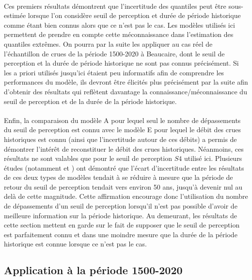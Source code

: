 \documentclass[11pt]{article}
\begin{document}
	\paragraph{} Ces premiers résultats démontrent que l'incertitude des quantiles peut être sous-estimée	lorsque l'on considère seuil de perception et durée de période historique comme étant bien connus alors que ce n'est pas le cas. Les modèles utilisés ici permettent de prendre en compte cette méconnaissance dans l'estimation des quantiles extrêmes. On pourra par la suite les appliquer au cas réel de l'échantillon de crues de la période 1500-2020 à Beaucaire, dont le seuil de perception et la durée de période historique ne sont pas connus précisément. Si les a priori utilisés jusqu'ici étaient peu informatifs afin de comprendre les performances du modèle, ils devront être élicités plus précisément par la suite afin d'obtenir des résultats qui reflètent davantage la connaissance/méconnaissance du seuil de perception et de la durée de la période historique.
		
	\paragraph{} Enfin, la comparaison du modèle A pour lequel seul le nombre de dépassements du seuil de perception est connu avec le modèle E pour lequel le débit des crues historiques est connu (ainsi que l'incertitude autour de ces débits) a permis de démontrer l'intérêt de reconstituer le débit des crues historiques. Néanmoins, ces résultats ne sont valables que pour le seuil de perception $S4$ utilisé ici. Plusieurs études (notamment \citet{stedinger_flood_1986} et \citet{payrastre_usefulness_2011}) ont démontré que l'écart d'incertitude entre les résultats de ces deux types de modèles tendait à se réduire à mesure que la période de retour du seuil de perception tendait vers environ 50 ans, jusqu'à devenir nul au delà de cette magnitude. Cette affirmation encourage donc l'utilisation du nombre de dépassements d'un seuil de perception lorsqu'il n'est pas possible d'avoir de meilleure information sur la période historique. Au demeurant, les résultats de cette section mettent en garde sur le fait de supposer que le seuil de perception est parfaitement connu et dans une moindre mesure que la durée de la période historique est connue lorsque ce n'est pas le cas.
	
	\subsection{Application à la période 1500-2020}
	\label{subsec:Results1500}
	
\end{document}
